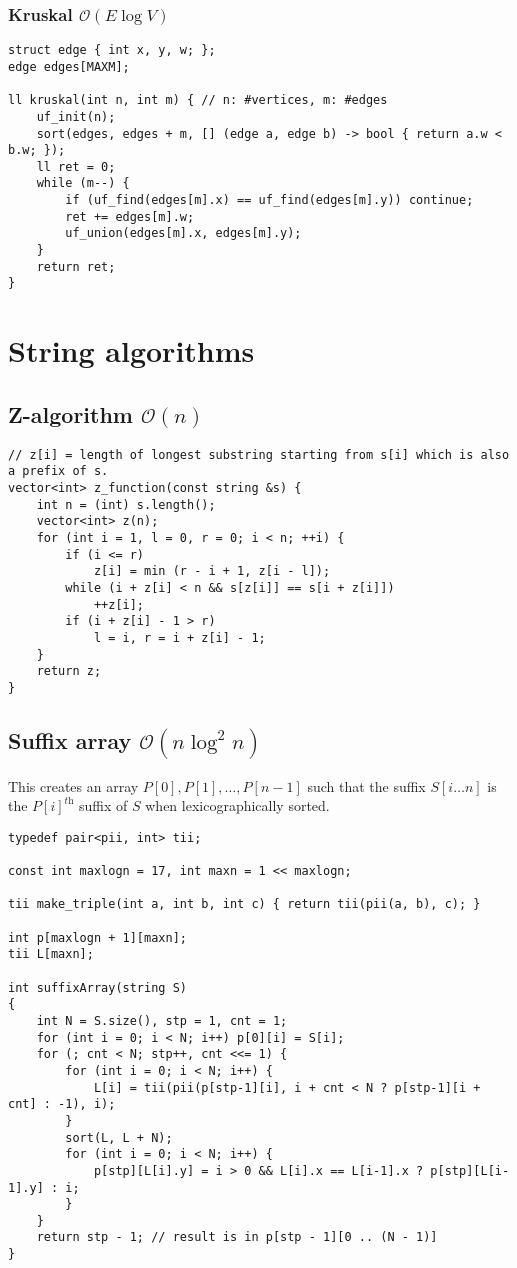 \documentclass{article}
\begin{document}
\subsubsection{Kruskal $\mathcal{O}(E \log V)$}

\begin{lstlisting}
struct edge { int x, y, w; };
edge edges[MAXM];

ll kruskal(int n, int m) { // n: #vertices, m: #edges
	uf_init(n);
	sort(edges, edges + m, [] (edge a, edge b) -> bool { return a.w < b.w; });
	ll ret = 0;
	while (m--) {
		if (uf_find(edges[m].x) == uf_find(edges[m].y)) continue;
		ret += edges[m].w;
		uf_union(edges[m].x, edges[m].y);
	}
	return ret;
}
\end{lstlisting}

\section{String algorithms}
\subsection{Z-algorithm $\mathcal{O}(n)$}

\begin{lstlisting}
// z[i] = length of longest substring starting from s[i] which is also a prefix of s.
vector<int> z_function(const string &s) {
	int n = (int) s.length();
	vector<int> z(n);
	for (int i = 1, l = 0, r = 0; i < n; ++i) {
		if (i <= r)
			z[i] = min (r - i + 1, z[i - l]);
		while (i + z[i] < n && s[z[i]] == s[i + z[i]])
			++z[i];
		if (i + z[i] - 1 > r)
			l = i, r = i + z[i] - 1;
	}
	return z;
}
\end{lstlisting}

\subsection{Suffix array $\mathcal{O}(n \log^2{n})$}

This creates an array $P[0], P[1], \dots, P[n-1]$ such that the suffix $S[i \dots n]$ is the $P[i]^\textit{th}$ suffix of $S$ when lexicographically sorted.

\begin{lstlisting}
typedef pair<pii, int> tii;

const int maxlogn = 17, int maxn = 1 << maxlogn;

tii make_triple(int a, int b, int c) { return tii(pii(a, b), c); }

int p[maxlogn + 1][maxn];
tii L[maxn];

int suffixArray(string S)
{
    int N = S.size(), stp = 1, cnt = 1;
    for (int i = 0; i < N; i++) p[0][i] = S[i];
    for (; cnt < N; stp++, cnt <<= 1) {
        for (int i = 0; i < N; i++) {
            L[i] = tii(pii(p[stp-1][i], i + cnt < N ? p[stp-1][i + cnt] : -1), i);
        }
        sort(L, L + N);
        for (int i = 0; i < N; i++) {
            p[stp][L[i].y] = i > 0 && L[i].x == L[i-1].x ? p[stp][L[i-1].y] : i;
        }
    }
	return stp - 1; // result is in p[stp - 1][0 .. (N - 1)]
}
\end{lstlisting}
\end{document}
